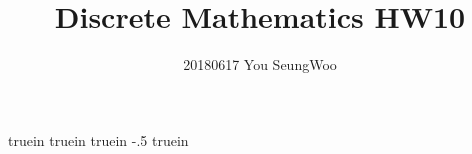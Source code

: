  truein 
 truein 
 truein 
\topmargin -.5 truein 
\textheight 8.5in
\setlength{\parindent}{0pt}
\hypersetup{
	colorlinks=true,
	linkcolor=red,
	filecolor=magenta,      
	urlcolor=cyan,
}


\title{Discrete Mathematics HW10}
\author{20180617 You SeungWoo}